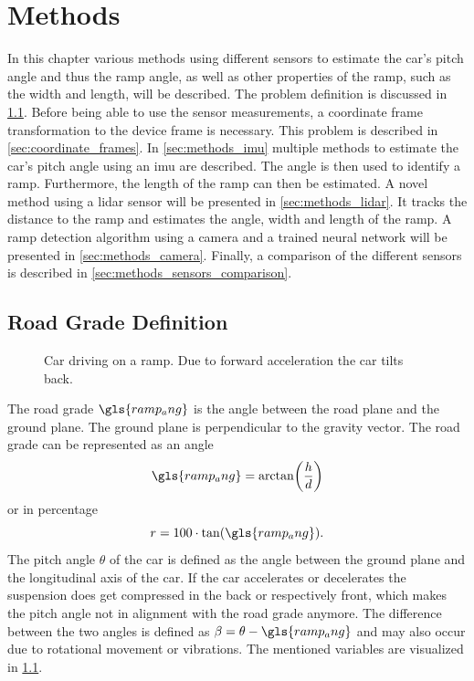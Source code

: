 \chapter{Methods}
\label{ch:Methods}

In this chapter various methods using different sensors to estimate the car's pitch angle and thus the ramp angle, as well as other properties of the ramp, such as the width and length, will be described.
The problem definition is discussed in \cref{sec:road_grade_definition}.
Before being able to use the sensor measurements, a coordinate frame transformation to the device frame is necessary.
This problem is described in \cref{sec:coordinate_frames}.
In \cref{sec:methods_imu} multiple methods to estimate the car's pitch angle using an \gls{imu} are described.
The angle is then used to identify a ramp.
Furthermore, the length of the ramp can then be estimated.
A novel method using a \gls{lidar} sensor will be presented in \cref{sec:methods_lidar}.
It tracks the distance to the ramp and estimates the angle, width and length of the ramp.
A ramp detection algorithm using a camera and a trained neural network will be presented in \cref{sec:methods_camera}.
Finally, a comparison of the different sensors is described in \cref{sec:methods_sensors_comparison}.


\section{Road Grade Definition}
\label{sec:road_grade_definition}
\begin{figure}[b]
    \centering
    
    \caption[Ramp angle definition]{Car driving on a ramp. Due to forward acceleration the car tilts back.}
    \label{fig:tikz_car_tilt}
\end{figure}
The road grade $\gls{ramp_ang}$ is the angle between the road plane and the ground plane.
The ground plane is perpendicular to the gravity vector.
The road grade can be represented as an angle
\begin{equation}
    \gls{ramp_ang} = \arctan(\frac{h}{d})
\end{equation}
or in percentage
\begin{equation}
    r = 100\cdot\tan(\gls{ramp_ang}).
\end{equation}
The pitch angle $\theta$ of the car is defined as the angle between the ground plane and the longitudinal axis of the car.
If the car accelerates or decelerates the suspension does get compressed in the back or respectively front, which makes the pitch angle not in alignment with the road grade anymore.
The difference between the two angles is defined as $\beta = \theta- \gls{ramp_ang}$ and may also occur due to rotational movement or vibrations.
The mentioned variables are visualized in \cref{fig:tikz_car_tilt}.



